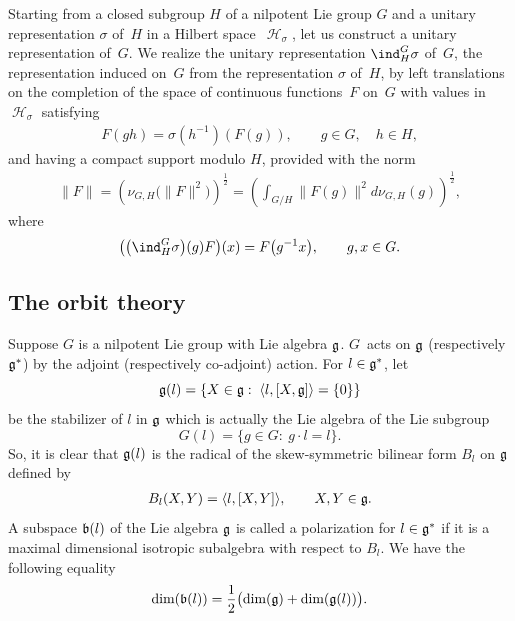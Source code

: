 \documentclass[11pt]{article}
\DeclareMathOperator{\Hi}{\mathscr{H}}
\def\hb#1{\hbox{#1}}
\def\hb #1{\hbox{#1}}
\def\hb#1{\hbox{#1}}
\def\dim#1{\hb{dim}(#1)}
\begin{document}
Starting from a closed
subgroup $H$ of a nilpotent Lie group $G$ and a unitary
representation $\sigma$ of~$H$ in a Hilbert space~$\Hi_\sigma$, let
us construct a unitary representation of~$G$. We realize the unitary
representation $\ind_H^G\sigma$ of~$G$, the representation induced
on~$G$ from the representation $\sigma$ of~$H$, by left translations
on the completion of the space of continuous functions~$F$ on~$G$
with values in~$\Hi_\sigma$ satisfying
\begin{gather}\label{covarience}
F(gh) = \sigma(h^{-1})(F(g)),\qquad  g\in G, \quad h\in H,
\end{gather}
and having a compact support modulo $H$, provided with the norm
\begin{gather*}%
\|F\| = \left(\nu_{G, H}\big(\|F\|^2\big)\right)^{\frac{1}{2}} =
\left(\int_{G/H} \|F(g)\|^2 d\nu_{G, H}(g)\right)^{\frac{1}{2}},
\end{gather*}
where
\begin{gather*}
\big(\big(\ind_H^G\sigma\big)(g) F\big)(x) = F\big(g^{-1} x\big),\qquad g, x\in G.
\end{gather*}

\subsection{The orbit theory}\label{section2.2}

Suppose $G$ is a nilpotent Lie group with Lie algebra $\frak g$. $G$~acts on $\frak g$ (respectively $\frak g^*$) by the adjoint
(respectively co-adjoint) action. For $l\in \frak g^*$, let
\[
\frak
g(l) = \{X\in \frak g:\; \langle l, [X, \frak g]\rangle = \{0\}\}
\]
be the stabilizer of $l$ in $\frak g$ which is actually the Lie
algebra of the Lie subgroup
\[
G(l) = \{g\in G:\ g\cdot l = l\}.
\]
So, it is clear that $\frak g(l)$ is the radical of the
skew-symmetric bilinear form $B_l$ on $\frak g$ def\/ined by
\begin{gather*}%
B_l(X, Y) = \langle l, [X, Y]\rangle,\qquad X, Y \in \frak g.
\end{gather*}
A subspace $\frak b(l)$ of the Lie algebra $\frak g$ is called a
polarization for $l\in \frak g^*$ if it is a maximal dimensional
isotropic subalgebra with respect to $B_l$. We have the following
equality
\begin{gather}\label{dim-pilarisation}
\dim{\frak b(l)}=\dfrac{1}{2} \big(\dim{\frak g}+\dim{\frak
g(l)}\big).
\end{gather}
\end{document}
